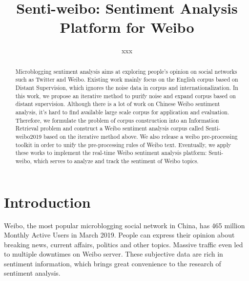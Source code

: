 \documentclass[runningheads]{llncs}
\begin{document}
%
\title{Senti-weibo: Sentiment Analysis Platform for Weibo}
%
\author{xxx}
%
%
%
\maketitle              %
%
\begin{abstract}
Microblogging sentiment analysis aims at exploring people's opinion on social networks such as Twitter and Weibo. Existing work mainly focus on the English corpus based on Distant Supervision, which ignores the noise data in corpus and internationalization. In this work, we propose an iterative method to purify noise and expand corpus based on distant supervision. Although there is a lot of work on Chinese Weibo sentiment analysis, it's hard to find available large scale corpus for application and evaluation. Therefore, we formulate the problem of corpus construction into an Information Retrieval problem and construct a Weibo sentiment analysis corpus called Senti-weibo2019 based on the iterative method above. We also release a weibo pre-processing toolkit in order to unify the pre-processing rules of Weibo text. Eventually, we apply these works to implement the real-time Weibo sentiment analysis platform: Senti-weibo, which serves to analyze and track the sentiment of Weibo topics.


\end{abstract}

\section{Introduction}
Weibo, the most popular microblogging social network in China, has 465 million Monthly Active Users in March 2019. People can express their opinion about breaking news, current affairs, politics and other topics. Massive traffic even led to multiple downtimes on Weibo server. These subjective data are rich in sentiment information, which brings great convenience to the research of sentiment analysis.
\end{document}

